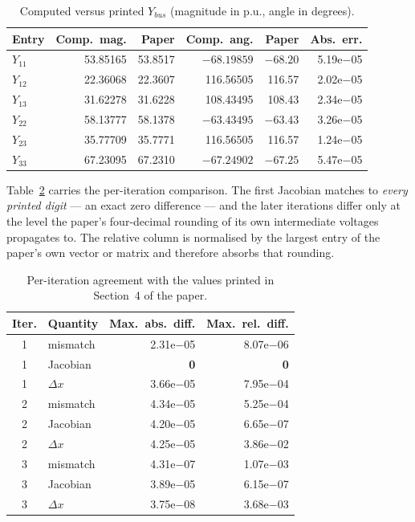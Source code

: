 \documentclass[sigconf,nonacm]{acmart}
\begin{document}
\begin{table}[t]
\centering
\caption{Computed versus printed $Y_{bus}$ (magnitude in p.u., angle in
degrees).}
\label{tab:ybus}
\footnotesize
\setlength{\tabcolsep}{3.5pt}
\begin{tabular}{l r r r r r}
\toprule
Entry & Comp.\ mag. & Paper & Comp.\ ang. & Paper & Abs.\ err. \\
\midrule
$Y_{11}$ & 53.85165 & 53.8517 & $-68.19859$ & $-68.20$ & 5.19e$-$05 \\
$Y_{12}$ & 22.36068 & 22.3607 & 116.56505 & 116.57 & 2.02e$-$05 \\
$Y_{13}$ & 31.62278 & 31.6228 & 108.43495 & 108.43 & 2.34e$-$05 \\
$Y_{22}$ & 58.13777 & 58.1378 & $-63.43495$ & $-63.43$ & 3.26e$-$05 \\
$Y_{23}$ & 35.77709 & 35.7771 & 116.56505 & 116.57 & 1.24e$-$05 \\
$Y_{33}$ & 67.23095 & 67.2310 & $-67.24902$ & $-67.25$ & 5.47e$-$05 \\
\bottomrule
\end{tabular}
\end{table}

Table~\ref{tab:iterations} carries the per-iteration comparison. The first
Jacobian matches to \emph{every printed digit} --- an exact zero difference ---
and the later iterations differ only at the level the paper's four-decimal
rounding of its own intermediate voltages propagates to. The relative column is
normalised by the largest entry of the paper's own vector or matrix and
therefore absorbs that rounding.

\begin{table}[t]
\centering
\caption{Per-iteration agreement with the values printed in Section~4 of the
paper.}
\label{tab:iterations}
\small
\begin{tabular}{c l r r}
\toprule
Iter. & Quantity & Max.\ abs.\ diff. & Max.\ rel.\ diff. \\
\midrule
1 & mismatch     & 2.31e$-$05 & 8.07e$-$06 \\
1 & Jacobian     & \textbf{0}  & \textbf{0} \\
1 & $\Delta x$   & 3.66e$-$05 & 7.95e$-$04 \\
2 & mismatch     & 4.34e$-$05 & 5.25e$-$04 \\
2 & Jacobian     & 4.20e$-$05 & 6.65e$-$07 \\
2 & $\Delta x$   & 4.25e$-$05 & 3.86e$-$02 \\
3 & mismatch     & 4.31e$-$07 & 1.07e$-$03 \\
3 & Jacobian     & 3.89e$-$05 & 6.15e$-$07 \\
3 & $\Delta x$   & 3.75e$-$08 & 3.68e$-$03 \\
\bottomrule
\end{tabular}
\end{table}
\end{document}
